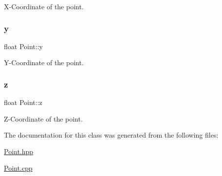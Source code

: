 X-\/\+Coordinate of the point. 

\mbox{\label{class_point_a6101960c8d2d4e8ea1d32c9234bbeb8d}} 
\subsubsection{\texorpdfstring{y}{y}}
{\footnotesize\ttfamily float Point\+::y}



Y-\/\+Coordinate of the point. 

\mbox{\label{class_point_a9a666531e0e99adff132be93d2407d0c}} 
\subsubsection{\texorpdfstring{z}{z}}
{\footnotesize\ttfamily float Point\+::z}



Z-\/\+Coordinate of the point. 



The documentation for this class was generated from the following files\+:\begin{DoxyCompactItemize}
\item 
\mbox{\hyperlink{_point_8hpp}{Point.\+hpp}}\item 
\mbox{\hyperlink{_point_8cpp}{Point.\+cpp}}\end{DoxyCompactItemize}
